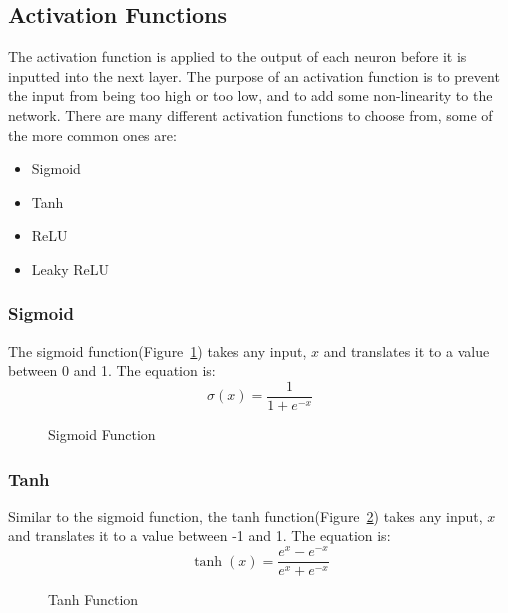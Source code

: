 \documentclass[titlepage]{article}
\begin{document}
\subsection{Activation Functions}
The activation function is applied to the output of each neuron before it is inputted into the next layer. The purpose of an activation function is to prevent the input from being too high or too low, and to add some non-linearity to the network. There are many different activation functions to choose from, some of the more common ones are:
\begin{itemize}
    \item Sigmoid
    \item Tanh
    \item ReLU
    \item Leaky ReLU
\end{itemize}
\subsubsection{Sigmoid}
The sigmoid function(Figure~\ref{fig:sigmoid_function}) takes any input, $x$ and translates it to a value between 0 and 1. The equation is:
\begin{equation}
    \sigma(x) = \frac{1}{1 + e^{-x}}
    \label{eq:sigmoid}
\end{equation}
\begin{figure}[h!]
    \begin{center}
    \end{center}
    \caption{Sigmoid Function}    
    \label{fig:sigmoid_function}
\end{figure}


\subsubsection{Tanh}
Similar to the sigmoid function, the tanh function(Figure~\ref{fig:tanh}) takes any input, $x$ and translates it to a value between -1 and 1. The equation is:
\begin{equation}
    \tanh(x) = \frac{e^{x} - e^{-x}}{e^{x} + e^{-x}}
    \label{eq:tanh}
\end{equation}
\begin{figure}[h!]
    \begin{center}
    \end{center}
    \caption{Tanh Function}    
    \label{fig:tanh}
\end{figure}
\end{document}
